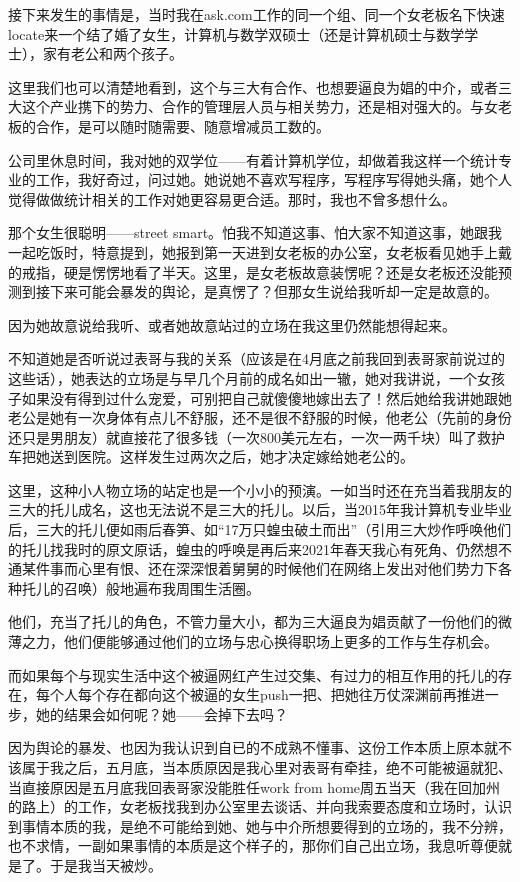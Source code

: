 \documentclass[9pt, b5paper]{article}
\begin{document}
接下来发生的事情是，当时我在ask.com工作的同一个组、同一个女老板名下快速locate来一个结了婚了女生，计算机与数学双硕士（还是计算机硕士与数学学士），家有老公和两个孩子。

这里我们也可以清楚地看到，这个与三大有合作、也想要逼良为娼的中介，或者三大这个产业携下的势力、合作的管理层人员与相关势力，还是相对强大的。与女老板的合作，是可以随时随需要、随意增减员工数的。 

公司里休息时间，我对她的双学位——有着计算机学位，却做着我这样一个统计专业的工作，我好奇过，问过她。她说她不喜欢写程序，写程序写得她头痛，她个人觉得做做统计相关的工作对她更容易更合适。那时，我也不曾多想什么。 

那个女生很聪明——street smart。怕我不知道这事、怕大家不知道这事，她跟我一起吃饭时，特意提到，她报到第一天进到女老板的办公室，女老板看见她手上戴的戒指，硬是愣愣地看了半天。这里，是女老板故意装愣呢？还是女老板还没能预测到接下来可能会暴发的舆论，是真愣了？但那女生说给我听却一定是故意的。

因为她故意说给我听、或者她故意站过的立场在我这里仍然能想得起来。 

不知道她是否听说过表哥与我的关系（应该是在4月底之前我回到表哥家前说过的这些话），她表达的立场是与早几个月前的成名如出一辙，她对我讲说，一个女孩子如果没有得到过什么宠爱，可别把自己就傻傻地嫁出去了！然后她给我讲她跟她老公是她有一次身体有点儿不舒服，还不是很不舒服的时候，他老公（先前的身份还只是男朋友）就直接花了很多钱（一次800美元左右，一次一两千块）叫了救护车把她送到医院。这样发生过两次之后，她才决定嫁给她老公的。 

这里，这种小人物立场的站定也是一个小小的预演。一如当时还在充当着我朋友的三大的托儿成名，这也无法说不是三大的托儿。以后，当2015年我计算机专业毕业后，三大的托儿便如雨后春笋、如“17万只蝗虫破土而出”（引用三大炒作呼唤他们的托儿找我时的原文原话，蝗虫的呼唤是再后来2021年春天我心有死角、仍然想不通某件事而心里有恨、还在深深恨着舅舅的时候他们在网络上发出对他们势力下各种托儿的召唤）般地遍布我周围生活圈。

他们，充当了托儿的角色，不管力量大小，都为三大逼良为娼贡献了一份他们的微薄之力，他们便能够通过他们的立场与忠心换得职场上更多的工作与生存机会。

而如果每个与现实生活中这个被逼网红产生过交集、有过力的相互作用的托儿的存在，每个人每个存在都向这个被逼的女生push一把、把她往万仗深渊前再推进一步，她的结果会如何呢？她——会掉下去吗？

因为舆论的暴发、也因为我认识到自已的不成熟不懂事、这份工作本质上原本就不该属于我之后，五月底，当本质原因是我心里对表哥有牵挂，绝不可能被逼就犯、当直接原因是五月底我回表哥家没能胜任work from home周五当天（我在回加州的路上）的工作，女老板找我到办公室里去谈话、并向我索要态度和立场时，认识到事情本质的我，是绝不可能给到她、她与中介所想要得到的立场的，我不分辨，也不求情，一副如果事情的本质是这个样子的，那你们自己出立场，我息听尊便就是了。于是我当天被炒。 
\end{document}
